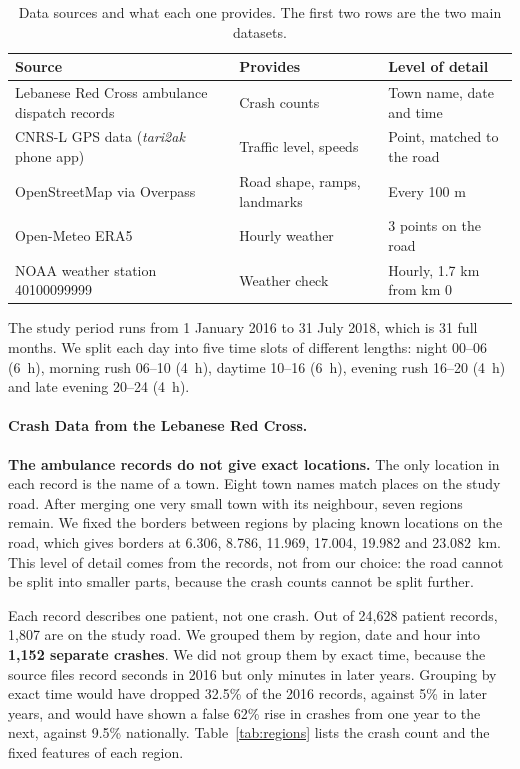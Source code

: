 \documentclass[11pt]{article}
\begin{document}
\begin{table}[htbp]
\centering
\caption{Data sources and what each one provides. The first two rows are the
two main datasets.}
\label{tab:sources}
\small
\begin{tabular}{@{}lll@{}}
\toprule
\textbf{Source} & \textbf{Provides} & \textbf{Level of detail} \\
\midrule
Lebanese Red Cross ambulance dispatch records & Crash counts & Town name, date and time \\
CNRS-L GPS data (\emph{tari2ak} phone app) & Traffic level, speeds & Point, matched to the road \\
OpenStreetMap via Overpass~\cite{osm} & Road shape, ramps, landmarks & Every 100 m \\
Open-Meteo ERA5~\cite{hersbach2020} & Hourly weather & 3 points on the road \\
NOAA weather station 40100099999 & Weather check & Hourly, 1.7 km from km 0 \\
\bottomrule
\end{tabular}
\end{table}

The study period runs from 1 January 2016 to 31 July 2018, which is 31 full
months. We split each day into five time slots of different lengths: night
00--06 (6~h), morning rush 06--10 (4~h), daytime 10--16 (6~h), evening rush
16--20 (4~h) and late evening 20--24 (4~h).

\paragraph{Crash Data from the Lebanese Red Cross.}
\textbf{The ambulance records do not give exact locations.} The only location
in each record is the name of a town. Eight town names match places on the
study road. After merging one very small town with its neighbour, seven regions
remain. We fixed the borders between regions by placing known locations on the
road, which gives borders at 6.306, 8.786, 11.969, 17.004, 19.982 and
23.082~km. This level of detail comes from the records, not from our choice:
the road cannot be split into smaller parts, because the crash counts cannot be
split further.

Each record describes one patient, not one crash. Out of 24{,}628 patient
records, 1{,}807 are on the study road. We grouped them by region, date and
hour into \textbf{1{,}152 separate crashes}. We did not group them by exact
time, because the source files record seconds in 2016 but only minutes in later
years. Grouping by exact time would have dropped 32.5\% of the 2016 records,
against 5\% in later years, and would have shown a false 62\% rise in crashes
from one year to the next, against 9.5\% nationally. Table~\ref{tab:regions}
lists the crash count and the fixed features of each region.
\end{document}
